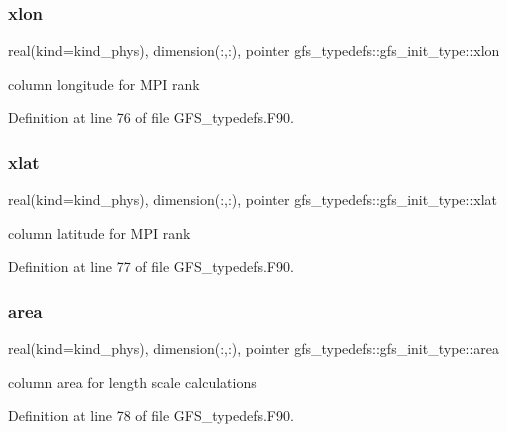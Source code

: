 \subsubsection{xlon}
{\footnotesize\ttfamily real(kind=kind\+\_\+phys), dimension(\+:,\+:), pointer gfs\+\_\+typedefs\+::gfs\+\_\+init\+\_\+type\+::xlon}



column longitude for M\+PI rank 



Definition at line 76 of file G\+F\+S\+\_\+typedefs.\+F90.

\mbox{\label{structgfs__typedefs_1_1gfs__init__type_a1e78583f739284671882bd9602597a20}} 
\subsubsection{xlat}
{\footnotesize\ttfamily real(kind=kind\+\_\+phys), dimension(\+:,\+:), pointer gfs\+\_\+typedefs\+::gfs\+\_\+init\+\_\+type\+::xlat}



column latitude for M\+PI rank 



Definition at line 77 of file G\+F\+S\+\_\+typedefs.\+F90.

\mbox{\label{structgfs__typedefs_1_1gfs__init__type_a0dab9957f42cce9ac02a14e672e9fa04}} 
\subsubsection{area}
{\footnotesize\ttfamily real(kind=kind\+\_\+phys), dimension(\+:,\+:), pointer gfs\+\_\+typedefs\+::gfs\+\_\+init\+\_\+type\+::area}



column area for length scale calculations 



Definition at line 78 of file G\+F\+S\+\_\+typedefs.\+F90.

\mbox{\label{structgfs__typedefs_1_1gfs__init__type_a5046f201549e140f544af95a0b09426b}} 
